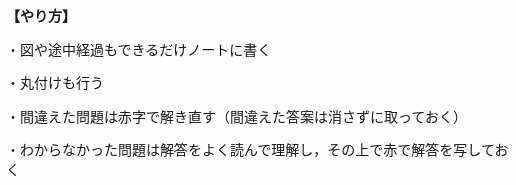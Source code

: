 \documentclass[a4j,10pt]{jsarticle}
\begin{document}
{\bf【やり方】}


・図や途中経過もできるだけノートに書く

・丸付けも行う

・間違えた問題は赤字で解き直す（間違えた答案は消さずに取っておく）

・わからなかった問題は解答をよく読んで理解し，その上で赤で解答を写しておく
\newpage
\tableofcontents
\newpage

  \ 
  
\newpage


 \ 
 
\newpage

 \ 
 
\newpage





 \ 
 
\newpage

 \ 
 
\newpage

 \ 
 
\newpage

 \ 
 
\newpage




 \ 
 
\newpage




 \ 
 
\newpage


 \ 
 
\newpage


 \ 
 
\newpage



 \ 
 
\newpage

 \ 
 
\newpage

 \ 
 
\newpage


 \ 
 
\newpage

 \ 
 
\newpage

 \ 
 
\newpage


 \ 
 
\newpage

 \ 
 
\newpage

 \ 
 
\newpage

 \ 
 
\newpage





\end{document}
